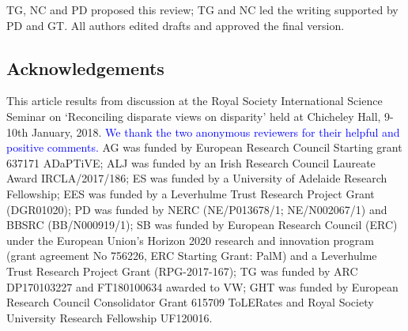 \documentclass[12pt,letterpaper]{article}
\begin{document}
TG, NC and PD proposed this review; TG and NC led the writing supported by PD and GT.
All authors edited drafts and approved the final version.

\subsection{Acknowledgements}

This article results from discussion at the Royal Society International Science Seminar on `Reconciling disparate views on disparity' held at Chicheley Hall, 9-10th January, 2018.
\textcolor{blue}{We thank the two anonymous reviewers for their helpful and positive comments.}
AG was funded by European Research Council Starting grant 637171 ADaPTiVE;
ALJ was funded by an Irish Research Council Laureate Award IRCLA/2017/186;
ES was funded by a University of Adelaide Research Fellowship;
EES was funded by a Leverhulme Trust Research Project Grant (DGR01020);
PD was funded by NERC (NE/P013678/1; NE/N002067/1) and BBSRC (BB/N000919/1);
SB was funded by European Research Council (ERC) under the European Union's Horizon 2020 research and innovation program (grant agreement No 756226, ERC Starting Grant: PalM) and a Leverhulme Trust Research Project Grant (RPG-2017-167);
TG was funded by ARC DP170103227 and FT180100634 awarded to VW;
GHT was funded by European Research Council Consolidator Grant 615709 ToLERates and Royal Society University Research Fellowship UF120016.



\end{document}
